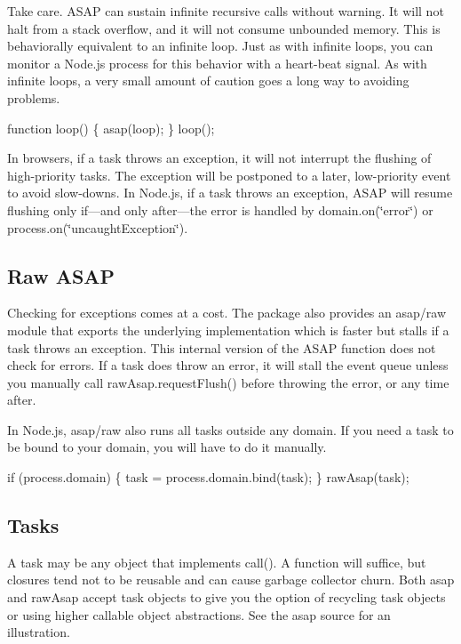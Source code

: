 Take care. A\+S\+AP can sustain infinite recursive calls without warning. It will not halt from a stack overflow, and it will not consume unbounded memory. This is behaviorally equivalent to an infinite loop. Just as with infinite loops, you can monitor a Node.\+js process for this behavior with a heart-\/beat signal. As with infinite loops, a very small amount of caution goes a long way to avoiding problems.


\begin{DoxyCode}
function loop() \{
    asap(loop);
\}
loop();
\end{DoxyCode}


In browsers, if a task throws an exception, it will not interrupt the flushing of high-\/priority tasks. The exception will be postponed to a later, low-\/priority event to avoid slow-\/downs. In Node.\+js, if a task throws an exception, A\+S\+AP will resume flushing only if—and only after—the error is handled by {\ttfamily domain.\+on(\char`\"{}error\char`\"{})} or {\ttfamily process.\+on(\char`\"{}uncaught\+Exception\char`\"{})}.

\subsection*{Raw A\+S\+AP}

Checking for exceptions comes at a cost. The package also provides an {\ttfamily asap/raw} module that exports the underlying implementation which is faster but stalls if a task throws an exception. This internal version of the A\+S\+AP function does not check for errors. If a task does throw an error, it will stall the event queue unless you manually call {\ttfamily raw\+Asap.\+request\+Flush()} before throwing the error, or any time after.

In Node.\+js, {\ttfamily asap/raw} also runs all tasks outside any domain. If you need a task to be bound to your domain, you will have to do it manually.


\begin{DoxyCode}
if (process.domain) \{
    task = process.domain.bind(task);
\}
rawAsap(task);
\end{DoxyCode}


\subsection*{Tasks}

A task may be any object that implements {\ttfamily call()}. A function will suffice, but closures tend not to be reusable and can cause garbage collector churn. Both {\ttfamily asap} and {\ttfamily raw\+Asap} accept task objects to give you the option of recycling task objects or using higher callable object abstractions. See the {\ttfamily asap} source for an illustration.

